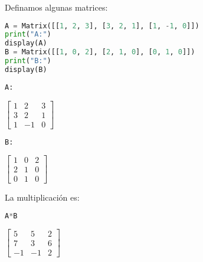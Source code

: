 \documentclass[a4,11pt]{aleph-notas}
\begin{document}
Definamos algunas matrices:
\begin{pycodigo}
    \begin{ipynbcodigo}\begin{lstlisting}[language=Python]
A = Matrix([[1, 2, 3], [3, 2, 1], [1, -1, 0]])
print("A:")
display(A)
B = Matrix([[1, 0, 2], [2, 1, 0], [0, 1, 0]])
print("B:")
display(B)
    \end{lstlisting}\end{ipynbcodigo}
    \begin{ipynbsalida}
    \begin{Verbatim}
A:
    \end{Verbatim}
    $\displaystyle \left[\begin{matrix}1 & 2 & 3\\3 & 2 & 1\\1 & -1 & 0\end{matrix}\right]$
    \begin{Verbatim}
B:
    \end{Verbatim}
    $\displaystyle \left[\begin{matrix}1 & 0 & 2\\2 & 1 & 0\\0 & 1 & 0\end{matrix}\right]$
    \end{ipynbsalida}
\end{pycodigo}

La multiplicación es:
\begin{pycodigo}
    \begin{ipynbcodigo}\begin{lstlisting}[language=Python]
A*B
    \end{lstlisting}\end{ipynbcodigo}
    \begin{ipynbsalida}[2mm]
        $\displaystyle \left[\begin{matrix}5 & 5 & 2\\7 & 3 & 6\\-1 & -1 & 2\end{matrix}\right]$
    \end{ipynbsalida}
\end{pycodigo}
\end{document}
